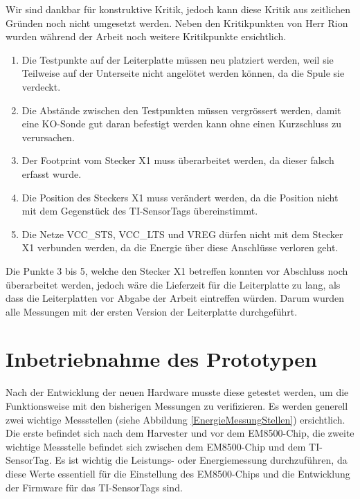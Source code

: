 \begin{minipage}{1\textwidth}
Wir sind dankbar für konstruktive Kritik, jedoch kann diese Kritik aus zeitlichen Gründen noch nicht umgesetzt werden. Neben den Kritikpunkten von Herr Rion wurden während der Arbeit noch weitere Kritikpunkte ersichtlich.

\begin{enumerate}
    \item Die Testpunkte auf der Leiterplatte müssen neu platziert werden, weil sie Teilweise auf der Unterseite nicht angelötet werden können, da die Spule sie verdeckt. 
    \item Die Abstände zwischen den Testpunkten müssen vergrössert werden, damit eine KO-Sonde gut daran befestigt werden kann ohne einen Kurzschluss zu verursachen.
    \item Der Footprint vom Stecker X1 muss überarbeitet werden, da dieser falsch erfasst wurde.
	\item Die Position des Steckers X1 muss verändert werden, da die Position nicht mit dem Gegenstück des TI-SensorTags übereinstimmt.
	\item Die Netze VCC\_STS, VCC\_LTS und VREG dürfen nicht mit dem Stecker X1 verbunden werden, da die Energie über diese Anschlüsse verloren geht.
\end{enumerate}
\end{minipage}

\newpage
Die Punkte 3 bis 5, welche den Stecker X1 betreffen konnten vor Abschluss noch überarbeitet werden, jedoch wäre die Lieferzeit für die Leiterplatte zu lang, als dass die Leiterplatten vor Abgabe der Arbeit eintreffen würden. Darum wurden alle Messungen mit der ersten Version der Leiterplatte durchgeführt.


\section{Inbetriebnahme des Prototypen}

Nach der Entwicklung der neuen Hardware musste diese getestet werden, um die Funktionsweise mit den bisherigen Messungen zu verifizieren. Es werden generell zwei wichtige Messstellen (siehe Abbildung \ref{EnergieMessungStellen}) ersichtlich. Die erste befindet sich nach dem Harvester und vor dem EM8500-Chip, die zweite wichtige Messstelle befindet sich zwischen dem EM8500-Chip und dem TI-SensorTag. Es ist wichtig die Leistungs- oder Energiemessung durchzuführen, da diese Werte essentiell für die Einstellung des EM8500-Chips und die Entwicklung der Firmware für das TI-SensorTags sind. 

